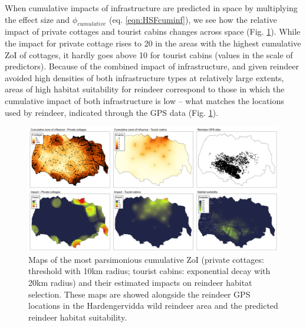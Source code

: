 \documentclass[titlepage]{article}
\begin{document}
When cumulative impacts of infrastructure are predicted in space by multiplying the effect size and $\phi_{cumulative}$ (eq. \ref{eqn:HSFcuminf}), we see how the relative impact of private cottages and tourist cabins changes across space (Fig. \ref{fig:prediction_maps}). While the impact for private cottage rises to 20 in the areas with the highest cumulative ZoI of cottages, it hardly goes above 10 for tourist cabins (values in the scale of predictors). Because of the combined impact of infrastructure, and given reindeer
avoided high densities of both infrastructure types at relatively large extents, 
areas of high habitat suitability for reindeer correspond to those in which the
cumulative impact of both infrastructure is low -- what matches the
locations used by reindeer, indicated through the GPS data (Fig. \ref{fig:prediction_maps}).

\begin{figure}[h]
\centering
\includegraphics[width=1.3\textwidth,center]{figures/reindeer_results_prediction_maps.png}
\caption{\label{fig:prediction_maps} Maps of the most parsimonious cumulative ZoI (private cottages: threshold with 10km radius; tourist cabins: exponential decay with 20km radius) and their estimated impacts on reindeer habitat selection. These maps are showed alongside the reindeer GPS locations in the Hardengervidda wild reindeer area and the predicted reindeer habitat suitability.}
\end{figure}

\end{document}
